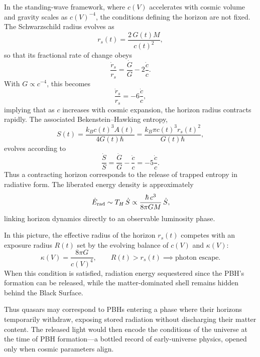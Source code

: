 \documentclass[12pt]{article}
\begin{document}
In the standing-wave framework, where $c(V)$ accelerates with cosmic volume and gravity scales as $c(V)^{-4}$, the conditions defining the horizon are not fixed. The Schwarzschild radius evolves as
\begin{equation}
    r_s(t) = \frac{2\,G(t)M}{c(t)^2},
\end{equation}
so that its fractional rate of change obeys
\begin{equation}
    \frac{\dot{r}_s}{r_s} = \frac{\dot{G}}{G} - 2\frac{\dot{c}}{c}.
\end{equation}
With $G \propto c^{-4}$, this becomes
\begin{equation}
    \frac{\dot{r}_s}{r_s} = -6\frac{\dot{c}}{c},
\end{equation}
implying that as $c$ increases with cosmic expansion, the horizon radius contracts rapidly. The associated Bekenstein--Hawking entropy,
\begin{equation}
    S(t) = \frac{k_B c(t)^3 A(t)}{4G(t)\hbar} = \frac{k_B \pi c(t)^3 r_s(t)^2}{G(t)\hbar},
\end{equation}
evolves according to
\begin{equation}
    \frac{\dot{S}}{S} = \frac{\dot{G}}{G} - \frac{\dot{c}}{c}
    = -5\frac{\dot{c}}{c}.
\end{equation}
Thus a contracting horizon corresponds to the release of trapped entropy in radiative form. The liberated energy density is approximately
\begin{equation}
    \dot{E}_{\rm rad} \sim T_H\,\dot{S}
    \propto \frac{\hbar\,c^3}{8\pi G M}\,\dot{S},
\end{equation}
linking horizon dynamics directly to an observable luminosity phase.

In this picture, the effective radius of the horizon $r_s(t)$ competes with an exposure radius $R(t)$ set by the evolving balance of $c(V)$ and $\kappa(V)$:
\begin{equation}
    \kappa(V) = \frac{8\pi G}{c(V)^4}, \qquad R(t) > r_s(t) \implies \text{photon escape}.
\end{equation}
When this condition is satisfied, radiation energy sequestered since the PBH’s formation can be released, while the matter-dominated shell remains hidden behind the Black Surface.

Thus quasars may correspond to PBHs entering a phase where their horizons temporarily withdraw, exposing stored radiation without discharging their matter content. The released light would then encode the conditions of the universe at the time of PBH formation---a bottled record of early-universe physics, opened only when cosmic parameters align.
\end{document}
